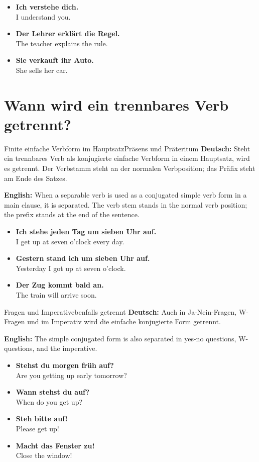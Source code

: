 \documentclass[a4paper,11pt]{article}
\newcommand{\GermanText}[1]{\textbf{Deutsch: }#1\par}
\newcommand{\EnglishText}[1]{{\small\color{SoftGray}\textbf{English: }#1\par}}
\newcommand{\ExampleItem}[2]{\item \textbf{#1}\\{\small\color{SoftGray}#2}}
\begin{document}
        \begin{exbox}
            \begin{itemize}
                \ExampleItem{Ich verstehe dich.}{I understand you.}
                \ExampleItem{Der Lehrer erklärt die Regel.}{The teacher explains the rule.}
                \ExampleItem{Sie verkauft ihr Auto.}{She sells her car.}
            \end{itemize}
        \end{exbox}


    \section{Wann wird ein trennbares Verb getrennt?}

        \begin{grammarentry}{Finite einfache Verbform im Hauptsatz}{Präsens und Präteritum}
            \GermanText{Steht ein trennbares Verb als konjugierte einfache Verbform in einem Hauptsatz, wird es getrennt. Der Verbstamm steht an der normalen Verbposition; das Präfix steht am Ende des Satzes.}
            \EnglishText{When a separable verb is used as a conjugated simple verb form in a main clause, it is separated. The verb stem stands in the normal verb position; the prefix stands at the end of the sentence.}
        \end{grammarentry}

        \begin{exbox}
            \begin{itemize}
                \ExampleItem{Ich stehe jeden Tag um sieben Uhr auf.}{I get up at seven o'clock every day.}
                \ExampleItem{Gestern stand ich um sieben Uhr auf.}{Yesterday I got up at seven o'clock.}
                \ExampleItem{Der Zug kommt bald an.}{The train will arrive soon.}
            \end{itemize}
        \end{exbox}

        \begin{grammarentry}{Fragen und Imperativ}{ebenfalls getrennt}
            \GermanText{Auch in Ja-Nein-Fragen, W-Fragen und im Imperativ wird die einfache konjugierte Form getrennt.}
            \EnglishText{The simple conjugated form is also separated in yes-no questions, W-questions, and the imperative.}
        \end{grammarentry}

        \begin{exbox}
            \begin{itemize}
                \ExampleItem{Stehst du morgen früh auf?}{Are you getting up early tomorrow?}
                \ExampleItem{Wann stehst du auf?}{When do you get up?}
                \ExampleItem{Steh bitte auf!}{Please get up!}
                \ExampleItem{Macht das Fenster zu!}{Close the window!}
            \end{itemize}
        \end{exbox}
\end{document}
